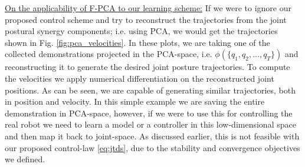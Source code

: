 \documentclass{article}
\begin{document}
\noindent \underline{On the applicability of F-PCA to our learning scheme:}  If we were to ignore our proposed control scheme and try to reconstruct the trajectories from the joint postural synergy components; i.e. using PCA, we would get the trajectories shown in Fig. \ref{fig:pca_velocities}. In these plots, we are taking one of the collected demonstrations projected in the PCA-space, i.e. $\phi(\{q_1,q_2,\dots,q_T\})$ and reconstructing it to generate the desired joint posture trajectories. To compute the velocities we apply numerical differentiation on the reconstructed joint positions. As can be seen, we are capable of generating similar trajectories, both in position and velocity. In this simple example we are saving the entire demonstration in PCA-space, however, if we were to use this for controlling the real robot we need to learn a model or a controller in this low-dimensional space and then map it back to joint-space. As discussed earlier, this is not feasible with our proposed control-law \eqref{eq:jtds}, due to the stability and convergence objectives we defined. 
\end{document}
